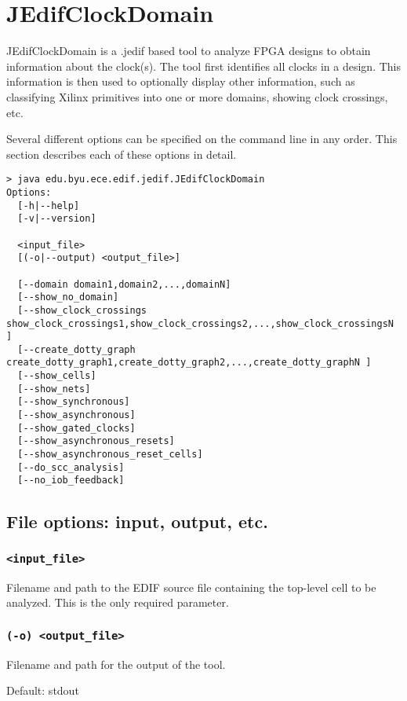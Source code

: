 
\section{JEdifClockDomain}
JEdifClockDomain is a .jedif based tool to analyze FPGA designs to obtain
information about the clock(s). The tool first identifies all clocks in a
design. This information is then used to optionally display other information,
such as classifying Xilinx primitives into one or more domains, showing clock
crossings, etc.

Several different options can be specified on the command line in any order.
This section describes each of these options in detail.

\begin{verbatim}
> java edu.byu.ece.edif.jedif.JEdifClockDomain
Options:
  [-h|--help]
  [-v|--version]

  <input_file>
  [(-o|--output) <output_file>]

  [--domain domain1,domain2,...,domainN]
  [--show_no_domain]
  [--show_clock_crossings show_clock_crossings1,show_clock_crossings2,...,show_clock_crossingsN ]
  [--create_dotty_graph create_dotty_graph1,create_dotty_graph2,...,create_dotty_graphN ]
  [--show_cells]
  [--show_nets]
  [--show_synchronous]
  [--show_asynchronous]
  [--show_gated_clocks]
  [--show_asynchronous_resets]
  [--show_asynchronous_reset_cells]
  [--do_scc_analysis]
  [--no_iob_feedback]
\end{verbatim}

\subsection{File options: input, output, etc.}

\subsubsection{\texttt{<input\_file>}}
Filename and path to the EDIF source file containing the top-level cell to be
analyzed. This is the only required parameter.

\subsubsection{\texttt{(-o) <output\_file>}}
Filename and path for the output of the tool.

Default: stdout


